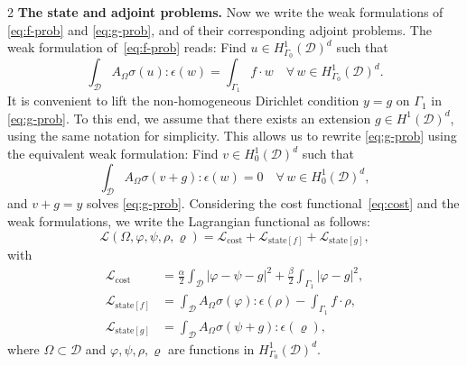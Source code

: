 \documentclass[a4paper, oneside]{article}
\newcommand{\hold}{\mathcal{D}}
\begin{document}
\begin{multicols}{2}
\textbf{The state and adjoint problems.}
Now we write the weak formulations of \eqref{eq:f-prob} and \eqref{eq:g-prob},
and of their corresponding adjoint problems.
The weak formulation of~\eqref{eq:f-prob} reads:
Find $u \in  H^1_{\Gamma_0}(\mathcal{D})^d$ such that
\begin{equation} \label{eq:w-f}
	\int_{\mathcal{D}} A_{\Omega}\sigma(u):\epsilon(w) =
	\int_{\Gamma_1} f \cdot w
	\quad
	\forall \, w \in  H^1_{\Gamma_0}(\mathcal{D})^d.
\end{equation}
It is convenient to lift the non-homogeneous Dirichlet condition $y=g$ on $\Gamma_1$ in \eqref{eq:g-prob}.
To this end, we assume that there exists an extension $g\in H^1(\hold)^d$, using the same notation for simplicity.
This allows us to rewrite \eqref{eq:g-prob} using the equivalent weak formulation:
Find $v \in  H^1_{0}(\mathcal{D})^d$ such that
\begin{equation} \label{eq:w-g}
	\int_{\mathcal{D}} A_{\Omega}\sigma(v + g):\epsilon(w) = 0
	\quad
	\forall \, w \in  H^1_{0}(\mathcal{D})^d,
\end{equation}
and ${v + g} =y$ solves \eqref{eq:g-prob}.
Considering the cost functional~\eqref{eq:cost}
and the weak formulations, we write
the Lagrangian functional
as follows:
\begin{equation} \label{eq:elastic_lag}
	\mathcal{L}(\Omega, \varphi, \psi, \rho, \varrho) =
	\mathcal{L}_{\mathrm{cost}} +
	\mathcal{L}_{\mathrm{state}[f]} +
	\mathcal{L}_{\mathrm{state}[g]},
\end{equation}
with
\begin{align*}
	\mathcal{L}_{\mathrm{cost}}    &= \frac{\alpha}{2}\int_{\mathcal{D}} \left|\varphi-\psi - g\right|^{2} + \frac{\beta}{2}\int_{\Gamma_{1}} \left|\varphi - g \right|^{2}, \\
	\mathcal{L}_{\mathrm{state}[f]}   &= \int_{\mathcal{D}} A_{\Omega} \sigma(\varphi) : \epsilon(\rho) - \int_{\Gamma_{1}} f \cdot \rho, \\
	\mathcal{L}_{\mathrm{state}[g]} &= \int_{\mathcal{D}} A_{\Omega} \sigma(\psi + g) : \epsilon(\varrho),
\end{align*}
where $\Omega\subset\mathcal{D}$ and $\varphi, \psi, \rho, \varrho$ are functions in $H^1_{\Gamma_0}(\mathcal{D})^d$.


\end{multicols}
\end{document}
